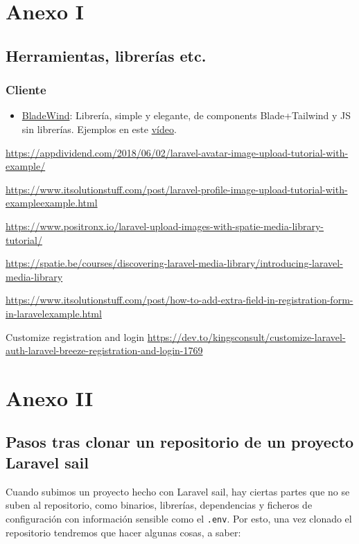 \documentclass[11pt]{article}
\begin{document}
\newpage


\section{Anexo I}
\label{sec:org4b3b045}
\subsection{Herramientas, librerías etc.}
\label{sec:org7db266d}
\subsubsection{Cliente}
\label{sec:org2bda744}
\begin{itemize}
\item \href{https://bladewindui.com/}{BladeWind}: Librería, simple y elegante, de components
Blade+Tailwind y JS sin librerías. Ejemplos en este \href{https://www.youtube.com/watch?v=UoKa5aKkv1U}{vídeo}.
\end{itemize}



\url{https://appdividend.com/2018/06/02/laravel-avatar-image-upload-tutorial-with-example/}

\url{https://www.itsolutionstuff.com/post/laravel-profile-image-upload-tutorial-with-exampleexample.html}

\url{https://www.positronx.io/laravel-upload-images-with-spatie-media-library-tutorial/}

\url{https://spatie.be/courses/discovering-laravel-media-library/introducing-laravel-media-library}

\url{https://www.itsolutionstuff.com/post/how-to-add-extra-field-in-registration-form-in-laravelexample.html}

Customize registration and login
\url{https://dev.to/kingsconsult/customize-laravel-auth-laravel-breeze-registration-and-login-1769}


\newpage


\section{Anexo II}
\label{sec:org3d0221e}
\subsection{Pasos tras clonar un repositorio de un proyecto Laravel sail}
\label{sec:org4cdc0a1}
Cuando subimos un proyecto hecho con Laravel sail, hay ciertas partes
que no se suben al repositorio, como binarios, librerías, dependencias
y ficheros de configuración con información sensible como el
\texttt{.env}. Por esto, una vez clonado el repositorio tendremos que hacer
algunas cosas, a saber:
\end{document}
